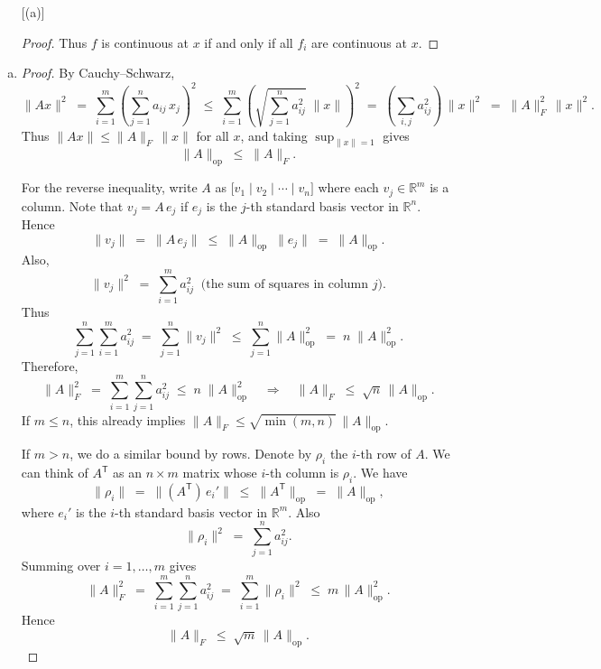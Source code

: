 \documentclass[11pt]{article}
\begin{document}
\begin{exercise}{5}
\begin{enumerate} [(a)]
\begin{proof}
Thus $f$ is continuous at $x$ if and only if all $f_i$ are continuous at $x$.
        \end{proof}
    \end{enumerate}
\end{exercise}

\begin{exercise}{6}
    \begin{enumerate} [(a)]
        \item \begin{proof}
            By Cauchy--Schwarz,
\[
 \|Ax\|^2
   \;=\;\sum_{i=1}^m \left(\sum_{j=1}^n a_{ij}\,x_j\right)^2
   \;\le\;\sum_{i=1}^m \left(\sqrt{\sum_{j=1}^n a_{ij}^2}\;\|x\|\right)^2
   \;=\;\left(\sum_{i,j} a_{ij}^2\right)\,\|x\|^2
   \;=\;\|A\|_F^2 \,\|x\|^2.
\]
Thus $\|Ax\|\le \|A\|_F\,\|x\|$ for all $x$, and taking $\sup_{\|x\|=1}$ gives
\[
  \|A\|_{\mathrm{op}}
    \;\le\;\|A\|_F.
\]

For the reverse inequality,
write $A$ as $\bigl[v_1\mid v_2\mid\cdots\mid v_n\bigr]$ where each $v_j\in \mathbb{R}^m$
is a column.  Note that $v_j = A\,e_j$ if $e_j$ is the $j$-th standard basis vector in
$\mathbb{R}^n$. Hence
\[
  \|v_j\|
    \;=\;\|A\,e_j\|
    \;\le\;\|A\|_{\mathrm{op}}\;\|e_j\|
    \;=\;\|A\|_{\mathrm{op}}.
\]
Also,
\[
  \|v_j\|^2
    \;=\;\sum_{i=1}^m a_{ij}^2
    \;\;\text{(the sum of squares in column }j\text{).}
\]
Thus
\[
  \sum_{j=1}^n\sum_{i=1}^m a_{ij}^2
    \;=\;\sum_{j=1}^n \|v_j\|^2
    \;\le\;\sum_{j=1}^n \|A\|_{\mathrm{op}}^2
    \;=\;n\;\|A\|_{\mathrm{op}}^2.
\]
Therefore,
\[
  \|A\|_{F}^2
    \;=\;\sum_{i=1}^m\sum_{j=1}^n a_{ij}^2
    \;\le\;n\;\|A\|_{\mathrm{op}}^2
    \quad\Longrightarrow\quad
  \|A\|_{F}\;\le\;\sqrt{n}\,\|A\|_{\mathrm{op}}.
\]
If $m \le n$, this already implies
$\|A\|_{F}\le \sqrt{\min(m,n)}\,\|A\|_{\mathrm{op}}$.

If $m>n$, we do a similar bound by rows.  Denote by $\rho_i$ the $i$-th row of $A$.  We can
think of $A^\mathsf{T}$ as an $n\times m$ matrix whose $i$-th column is $\rho_i$.
We have
\[
  \|\rho_i\|
    \;=\;\| (A^\mathsf{T})\,e_i'\|
    \;\le\;\|A^\mathsf{T}\|_{\mathrm{op}}
    \;=\;\|A\|_{\mathrm{op}},
\]
where $e_i'$ is the $i$-th standard basis vector in $\mathbb{R}^m$. Also
\[
  \|\rho_i\|^2
    \;=\;\sum_{j=1}^n a_{ij}^2.
\]
Summing over $i=1,\dots,m$ gives
\[
  \|A\|_F^2
    \;=\;\sum_{i=1}^m \sum_{j=1}^n a_{ij}^2
    \;=\;\sum_{i=1}^m \|\rho_i\|^2
    \;\le\;m\,\|A\|_{\mathrm{op}}^2.
\]
Hence
\[
  \|A\|_F \;\le\;\sqrt{m}\,\|A\|_{\mathrm{op}}.
\]


\end{proof}
\end{enumerate}
\end{exercise}
\end{document}
